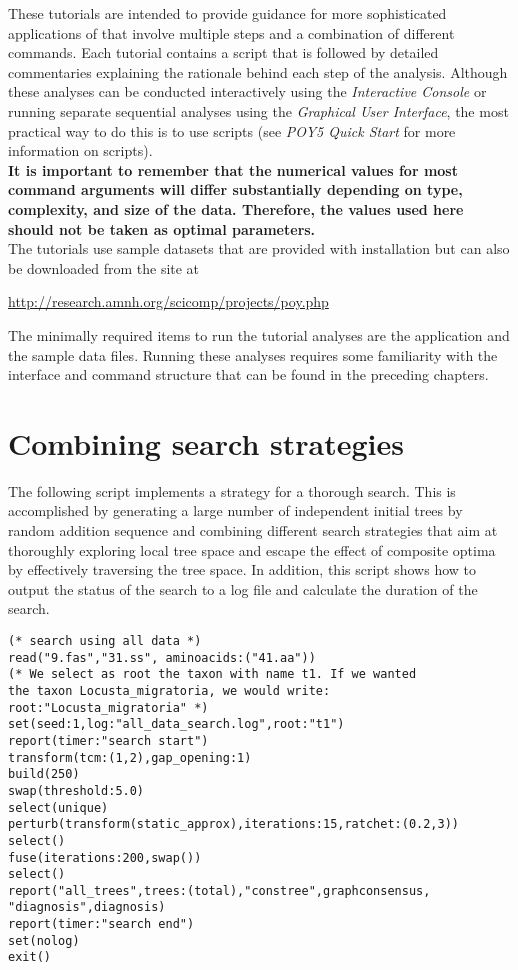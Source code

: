 These tutorials are intended to provide guidance for more sophisticated applications of \poy that involve 
multiple steps and a combination of different commands. Each tutorial contains a \poy script that is followed 
by detailed commentaries explaining the rationale behind each step of the analysis. Although these analyses 
can be conducted interactively using the \emph{Interactive Console} or running separate sequential analyses
 using the \emph{Graphical User Interface}, the most practical way to do this is to use \poy scripts (see 
 \emph{ POY5 Quick Start} for more information on \poy scripts).\\

{\bf It is important to remember that the numerical values for most command arguments will differ substantially 
depending on type, complexity, and size of the data. Therefore, the values used here should not be taken as 
optimal parameters.}\\

The tutorials use sample datasets that are provided with \poy installation but can also be downloaded from 
the \poy site at
\begin{center}
\url{http://research.amnh.org/scicomp/projects/poy.php}
\end{center}
The minimally required items to run the tutorial analyses are the \poy application and the sample data files. 
Running these analyses requires some familiarity with the \poy interface and command structure that can be 
found in the preceding chapters.

\section{Combining  search strategies}{\label{tutorial1}}
The following script implements a strategy for a thorough search. This is accomplished by generating a large 
number of independent initial trees by random addition sequence and combining different search strategies 
that aim at thoroughly exploring local tree space and escape the effect of composite optima by effectively 
traversing the tree space. In addition, this script shows how to output the status of the search to a log file and
 calculate the duration of the search. 

\begin{verbatim}
(* search using all data *)
read("9.fas","31.ss", aminoacids:("41.aa"))
(* We select as root the taxon with name t1. If we wanted
the taxon Locusta_migratoria, we would write:
root:"Locusta_migratoria" *)
set(seed:1,log:"all_data_search.log",root:"t1")
report(timer:"search start")
transform(tcm:(1,2),gap_opening:1)
build(250)
swap(threshold:5.0)
select(unique)
perturb(transform(static_approx),iterations:15,ratchet:(0.2,3))
select()
fuse(iterations:200,swap())
select()
report("all_trees",trees:(total),"constree",graphconsensus,
"diagnosis",diagnosis)
report(timer:"search end")
set(nolog)
exit()
\end{verbatim}

